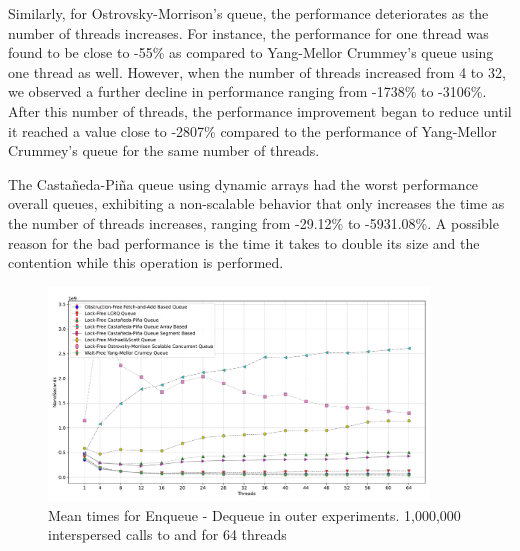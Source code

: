 Similarly, for Ostrovsky-Morrison's queue, the performance deteriorates as the number of threads increases. For instance, the performance for one thread was found to be close to -55\% as compared to Yang-Mellor Crummey's queue using one thread as well. However, when the number of threads increased from 4 to 32, we observed a further decline in performance ranging from -1738\% to -3106\%. After this number of threads, the performance improvement began to reduce until it reached a value close to -2807\% compared to the performance of Yang-Mellor Crummey's queue for the same number of threads.

The Castañeda-Piña queue using dynamic arrays had the worst performance overall queues, exhibiting a non-scalable behavior that only increases the time as the number of threads increases, ranging from -29.12\% to -5931.08\%. A possible reason for the bad performance is the time it takes to double its size and the contention while this operation is performed.

\begin{figure}[ht]
  \centering
  \includegraphics[width=0.9\textwidth]{contents/figures/V_64_outer_enq_deq_all.pdf}
  \caption{\label{fig:64-outer--enq-deq} Mean times for Enqueue - Dequeue in outer experiments. 1,000,000 interspersed calls to \Enq and \Deq  for 64 threads}
\end{figure}

